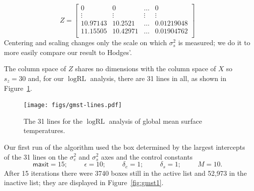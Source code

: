 \documentclass{report}
\newcommand{\textcompute}{\textsf}
\newcommand{\RLorig}{\text{RL}}
\newcommand{\logRLorig}{\log\RLorig}
\newcommand{\sigssq}{\sigma_s^2}
\newcommand{\sigesq}{\sigma_e^2}
\newcommand{\maxit}{\textcompute{maxit}}
\begin{document}
\begin{equation*}
Z =	\begin{bmatrix} 
		0 & 0 & \dots & 0\\
		\vdots & \vdots & \vdots & \vdots\\
		10.97143 & 10.2521 & \dots & 0.01219048\\
		11.15505 & 10.42971 & \dots & 0.01904762\\
	\end{bmatrix}
\end{equation*}
Centering and scaling changes only the scale on which $\sigssq$ is measured; we do it to more easily compare our result to Hodges'.

The column space of $Z$ shares no dimensions with the column space of $X$ so $s_z=30$ and, for our $\logRLorig$ analysis, there are 31 lines in all, as shown in Figure~\ref{fig:gmst-lines}.
\begin{figure}
	\centering
	\texttt{[image: figs/gmst-lines.pdf]}
	\caption{The 31 lines for the $\logRLorig$ analysis of
	              global mean surface temperatures.}
	\label{fig:gmst-lines}
\end{figure}
Our first run of the algorithm used the box determined by the largest intercepts of the 31 lines on the $\sigesq$ and $\sigssq$ axes and the control constants 
\begin{equation*}
	\maxit=15; \hspace{1cm} \epsilon=10; \hspace{1cm}
	\delta_e=1; \hspace{1cm} \delta_s=1; \hspace{1cm} M=10.
\end{equation*}
After 15 iterations there were 3740 boxes still in the active list and 52,973 in the inactive list; they are displayed in Figure~\ref{fig:gmst1}.
\end{document}
